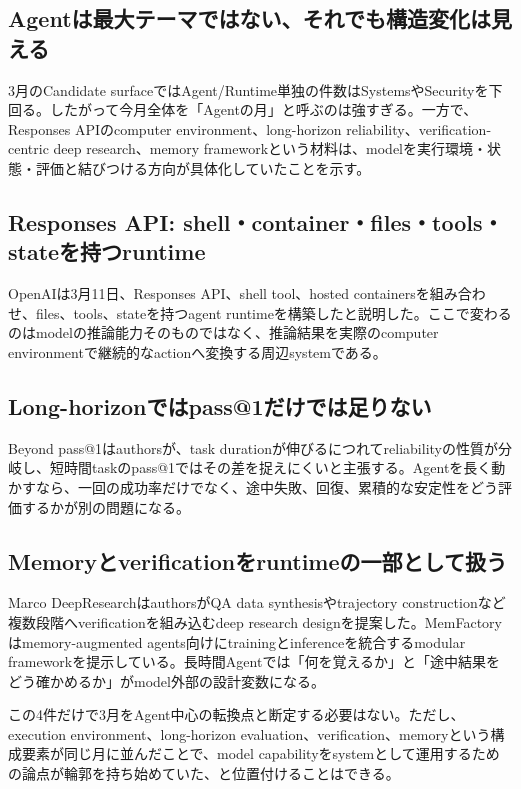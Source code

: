 \begingroup\raggedright
\subsection{Agentは最大テーマではない、それでも構造変化は見える}
\par\endgroup

3月のCandidate surfaceではAgent/Runtime単独の件数はSystemsやSecurityを下回る。したがって今月全体を「Agentの月」と呼ぶのは強すぎる。一方で、Responses APIのcomputer environment、long-horizon reliability、verification-centric deep research、memory frameworkという材料は、modelを実行環境・状態・評価と結びつける方向が具体化していたことを示す。\autocite{src-01572b4c34e9,src-0ec537ec1cc1,src-2b8b39e5cae3,src-42318ebdee75}


\begingroup\raggedright
\subsection{Responses API: shell・container・files・tools・stateを持つruntime}
\par\endgroup

OpenAIは3月11日、Responses API、shell tool、hosted containersを組み合わせ、files、tools、stateを持つagent runtimeを構築したと説明した。ここで変わるのはmodelの推論能力そのものではなく、推論結果を実際のcomputer environmentで継続的なactionへ変換する周辺systemである。\autocite{src-01572b4c34e9}


\begingroup\raggedright
\subsection{Long-horizonではpass@1だけでは足りない}
\par\endgroup

Beyond pass@1はauthorsが、task durationが伸びるにつれてreliabilityの性質が分岐し、短時間taskのpass@1ではその差を捉えにくいと主張する。Agentを長く動かすなら、一回の成功率だけでなく、途中失敗、回復、累積的な安定性をどう評価するかが別の問題になる。\autocite{src-0ec537ec1cc1}


\begingroup\raggedright
\subsection{Memoryとverificationをruntimeの一部として扱う}
\par\endgroup

Marco DeepResearchはauthorsがQA data synthesisやtrajectory constructionなど複数段階へverificationを組み込むdeep research designを提案した。MemFactoryはmemory-augmented agents向けにtrainingとinferenceを統合するmodular frameworkを提示している。長時間Agentでは「何を覚えるか」と「途中結果をどう確かめるか」がmodel外部の設計変数になる。\autocite{src-2b8b39e5cae3,src-42318ebdee75}


この4件だけで3月をAgent中心の転換点と断定する必要はない。ただし、execution environment、long-horizon evaluation、verification、memoryという構成要素が同じ月に並んだことで、model capabilityをsystemとして運用するための論点が輪郭を持ち始めていた、と位置付けることはできる。\autocite{src-01572b4c34e9,src-0ec537ec1cc1,src-2b8b39e5cae3,src-42318ebdee75}


